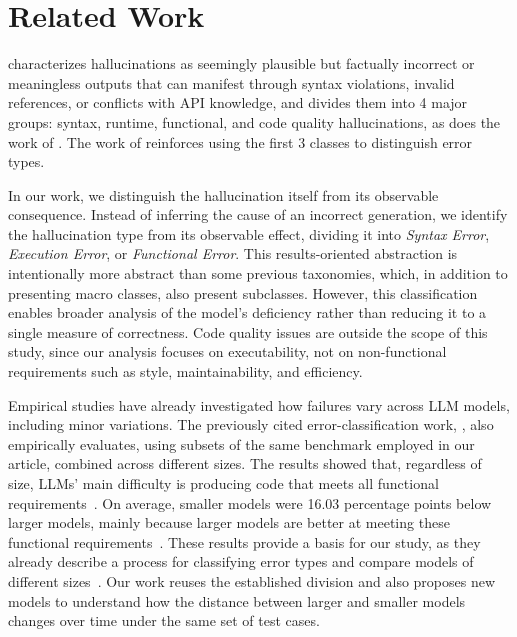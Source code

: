 \section{Related Work}

\citet{pavel2025hallucination} characterizes hallucinations as seemingly plausible but factually incorrect or meaningless outputs that can manifest through syntax violations, invalid references, or conflicts with API knowledge, and divides them into 4 major groups: syntax, runtime, functional, and code quality hallucinations, as does the work of \citet{lee2025hallucination}. The work of \citet{dou2025whatswrong} reinforces using the first 3 classes to distinguish error types.

In our work, we distinguish the hallucination itself from its observable consequence. Instead of inferring the cause of an incorrect generation, we identify the hallucination type from its observable effect, dividing it into \emph{Syntax Error}, \emph{Execution Error}, or \emph{Functional Error}. This results-oriented abstraction is intentionally more abstract than some previous taxonomies, which, in addition to presenting macro classes, also present subclasses. However, this classification enables broader analysis of the model's deficiency rather than reducing it to a single measure of correctness. Code quality issues are outside the scope of this study, since our analysis focuses on executability, not on non-functional requirements such as style, maintainability, and efficiency.

Empirical studies have already investigated how failures vary across LLM models, including minor variations. The previously cited error-classification work, \citet{dou2025whatswrong}, also empirically evaluates, using subsets of the same benchmark employed in our article, combined across different sizes. The results showed that, regardless of size, LLMs' main difficulty is producing code that meets all functional requirements~\citep{dou2025whatswrong}. On average, smaller models were 16.03 percentage points below larger models, mainly because larger models are better at meeting these functional requirements~\citep{dou2025whatswrong}. These results provide a basis for our study, as they already describe a process for classifying error types and compare models of different sizes~\citep{dou2025whatswrong}. Our work reuses the established division and also proposes new models to understand how the distance between larger and smaller models changes over time under the same set of test cases.

